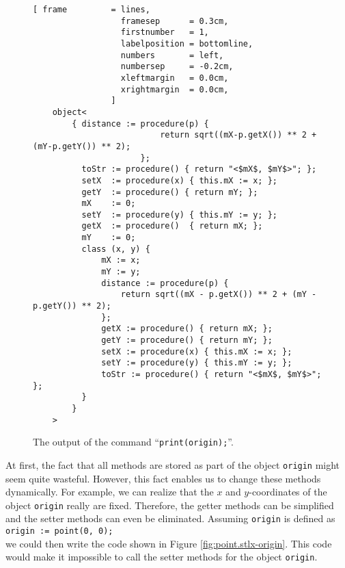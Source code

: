 \begin{figure}[!ht]
\centering
\begin{Verbatim}[ frame         = lines, 
                  framesep      = 0.3cm, 
                  firstnumber   = 1,
                  labelposition = bottomline,
                  numbers       = left,
                  numbersep     = -0.2cm,
                  xleftmargin   = 0.0cm,
                  xrightmargin  = 0.0cm,
                ]
    object<
        { distance := procedure(p) { 
                          return sqrt((mX-p.getX()) ** 2 + (mY-p.getY()) ** 2); 
                      }; 
          toStr := procedure() { return "<$mX$, $mY$>"; }; 
          setX  := procedure(x) { this.mX := x; }; 
          getY  := procedure() { return mY; }; 
          mX    := 0; 
          setY  := procedure(y) { this.mY := y; }; 
          getX  := procedure()  { return mX; }; 
          mY    := 0; 
          class (x, y) { 
              mX := x; 
              mY := y; 
              distance := procedure(p) { 
                  return sqrt((mX - p.getX()) ** 2 + (mY - p.getY()) ** 2); 
              }; 
              getX := procedure() { return mX; };
              getY := procedure() { return mY; }; 
              setX := procedure(x) { this.mX := x; }; 
              setY := procedure(y) { this.mY := y; }; 
              toStr := procedure() { return "<$mX$, $mY$>"; }; 
          } 
        }
    >
\end{Verbatim}
\vspace*{-0.3cm}
\caption{The output of the command ``\texttt{print(origin);}''.}
\label{fig:print_origin}
\end{figure}

At first, the fact that all methods are stored as part of the object \texttt{origin} might seem quite
wasteful.  However, this fact enables us to change these methods dynamically.  For example, we can
realize that the $x$ and $y$-coordinates of the object \texttt{origin} really are fixed.  Therefore,
the getter methods can be 
simplified and the setter methods can even be eliminated.  Assuming \texttt{origin} is defined as
\\[0.2cm]
\hspace*{1.3cm}
\texttt{origin := point(0, 0);}
\\[0.2cm]
we could then write the code shown in Figure \ref{fig:point.stlx-origin}.
This code would make it impossible to call the setter methods for the object \texttt{origin}.


